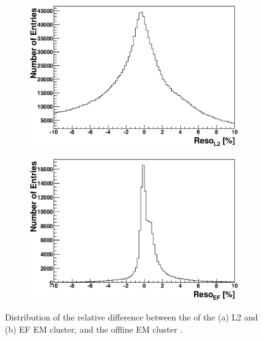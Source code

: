\begin{figure}
\centering
        \begin{subfigure}[b]{0.5\textwidth}
                \centering
                \includegraphics[width=\textwidth]{figures/ServiceWork/run_190644/Reso_Matched_L2.eps}
        \end{subfigure}%
        \begin{subfigure}[b]{0.5\textwidth}
                \centering
                \includegraphics[width=\textwidth]{figures/ServiceWork/run_190644/Reso_Matched_EF.eps}
        \end{subfigure}%
\caption[Offline EM \et{} versus L2/EF EM \et{}]{
Distribution of the relative difference between the \et{} of the (a) L2 and (b) EF EM cluster, and the offline EM cluster \et{}.
\label{SW_egamma_L2EF_Reso}}
\end{figure}


